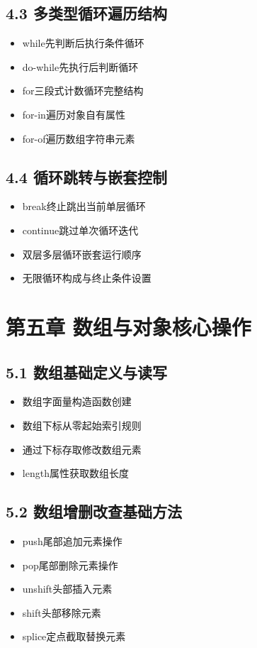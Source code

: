 \subsection{4.3 多类型循环遍历结构}
\begin{itemize}
\item while先判断后执行条件循环
\item do-while先执行后判断循环
\item for三段式计数循环完整结构
\item for-in遍历对象自有属性
\item for-of遍历数组字符串元素
\end{itemize}

\subsection{4.4 循环跳转与嵌套控制}
\begin{itemize}
\item break终止跳出当前单层循环
\item continue跳过单次循环迭代
\item 双层多层循环嵌套运行顺序
\item 无限循环构成与终止条件设置
\end{itemize}

\section{第五章 数组与对象核心操作}
\subsection{5.1 数组基础定义与读写}
\begin{itemize}
\item 数组字面量构造函数创建
\item 数组下标从零起始索引规则
\item 通过下标存取修改数组元素
\item length属性获取数组长度
\end{itemize}

\subsection{5.2 数组增删改查基础方法}
\begin{itemize}
\item push尾部追加元素操作
\item pop尾部删除元素操作
\item unshift头部插入元素
\item shift头部移除元素
\item splice定点截取替换元素
\end{itemize}


